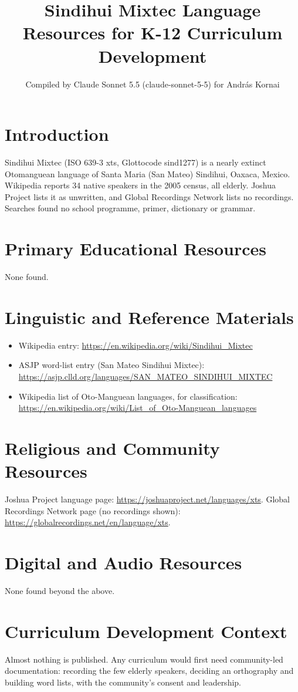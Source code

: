 \documentclass[12pt]{article}
\title{Sindihui Mixtec Language Resources for K-12 Curriculum Development}
\author{Compiled by Claude Sonnet 5.5 (claude-sonnet-5-5) for Andr\'as Kornai}
\date{}
\begin{document}
\maketitle

\section{Introduction}
Sindihui Mixtec (ISO 639-3 xts, Glottocode sind1277) is a nearly extinct Otomanguean language of Santa Maria (San Mateo) Sindihui, Oaxaca, Mexico. Wikipedia reports 34 native speakers in the 2005 census, all elderly. Joshua Project lists it as unwritten, and Global Recordings Network lists no recordings. Searches found no school programme, primer, dictionary or grammar.

\section{Primary Educational Resources}
None found.

\section{Linguistic and Reference Materials}
\begin{itemize}
\item Wikipedia entry: \url{https://en.wikipedia.org/wiki/Sindihui_Mixtec}
\item ASJP word-list entry (San Mateo Sindihui Mixtec): \url{https://asjp.clld.org/languages/SAN_MATEO_SINDIHUI_MIXTEC}
\item Wikipedia list of Oto-Manguean languages, for classification: \url{https://en.wikipedia.org/wiki/List_of_Oto-Manguean_languages}
\end{itemize}

\section{Religious and Community Resources}
Joshua Project language page: \url{https://joshuaproject.net/languages/xts}. Global Recordings Network page (no recordings shown): \url{https://globalrecordings.net/en/language/xts}.

\section{Digital and Audio Resources}
None found beyond the above.

\section{Curriculum Development Context}
Almost nothing is published. Any curriculum would first need community-led documentation: recording the few elderly speakers, deciding an orthography and building word lists, with the community's consent and leadership.
\end{document}
